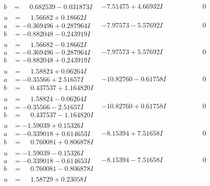 \documentclass[1p]{elsarticle_modified}
\theoremstyle{definition}
\begin{document}
$$\begin{array}{c|c|c}
\begin{aligned}
b &= \phantom{-}0.682539 - 0.031873 I\end{aligned}
 & -7.51475 + 4.66932 I & \phantom{-0.000000 } 0 \\ \hline\begin{aligned}
u &= \phantom{-}1.56682 + 0.18662 I \\
a &= -0.369496 + 0.287964 I \\
b &= -0.882048 - 0.243919 I\end{aligned}
 & -7.97573 - 5.57692 I & \phantom{-0.000000 } 0 \\ \hline\begin{aligned}
u &= \phantom{-}1.56682 - 0.18662 I \\
a &= -0.369496 - 0.287964 I \\
b &= -0.882048 + 0.243919 I\end{aligned}
 & -7.97573 + 5.57692 I & \phantom{-0.000000 } 0 \\ \hline\begin{aligned}
u &= \phantom{-}1.58824 + 0.06264 I \\
a &= -0.35566 + 2.51657 I \\
b &= \phantom{-}0.437537 + 1.164820 I\end{aligned}
 & -10.82760 - 0.61758 I & \phantom{-0.000000 } 0 \\ \hline\begin{aligned}
u &= \phantom{-}1.58824 - 0.06264 I \\
a &= -0.35566 - 2.51657 I \\
b &= \phantom{-}0.437537 - 1.164820 I\end{aligned}
 & -10.82760 + 0.61758 I & \phantom{-0.000000 } 0 \\ \hline\begin{aligned}
u &= -1.59039 + 0.15326 I \\
a &= -0.339018 + 0.614653 I \\
b &= \phantom{-}0.760081 + 0.806878 I\end{aligned}
 & -8.15394 + 7.51658 I & \phantom{-0.000000 } 0 \\ \hline\begin{aligned}
u &= -1.59039 - 0.15326 I \\
a &= -0.339018 - 0.614653 I \\
b &= \phantom{-}0.760081 - 0.806878 I\end{aligned}
 & -8.15394 - 7.51658 I & \phantom{-0.000000 } 0 \\ \hline\begin{aligned}
u &= \phantom{-}1.58729 + 0.23058 I \\

\end{aligned}
\end{array}$$
\end{document}
